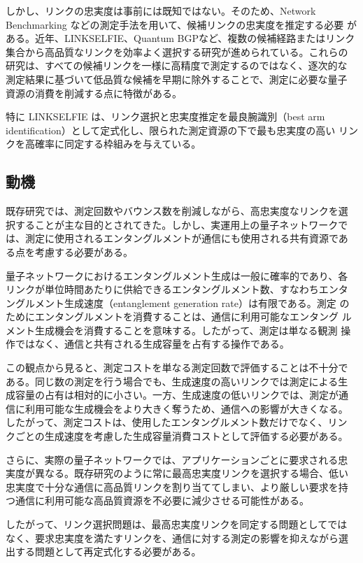 \documentclass[conference]{IEEEtran}
\begin{document}
しかし、リンクの忠実度は事前には既知ではない。そのため、Network
Benchmarking などの測定手法を用いて、候補リンクの忠実度を推定する必要
がある。近年、LINKSELFIE、Quantum BGPなど、複数の候補経路またはリンク
集合から高品質なリンクを効率よく選択する研究が進められている。これらの
研究は、すべての候補リンクを一様に高精度で測定するのではなく、逐次的な
測定結果に基づいて低品質な候補を早期に除外することで、測定に必要な量子
資源の消費を削減する点に特徴がある。

特に LINKSELFIE は、リンク選択と忠実度推定を最良腕識別（best arm
identification）として定式化し、限られた測定資源の下で最も忠実度の高い
リンクを高確率に同定する枠組みを与えている。

\subsection{動機}
\label{sec:orgf974fa5}

既存研究では、測定回数やバウンス数を削減しながら、高忠実度なリンクを選
択することが主な目的とされてきた。しかし、実運用上の量子ネットワークで
は、測定に使用されるエンタングルメントが通信にも使用される共有資源であ
る点を考慮する必要がある。

量子ネットワークにおけるエンタングルメント生成は一般に確率的であり、各
リンクが単位時間あたりに供給できるエンタングルメント数、すなわちエンタ
ングルメント生成速度（entanglement generation rate）は有限である。測定
のためにエンタングルメントを消費することは、通信に利用可能なエンタング
ルメント生成機会を消費することを意味する。したがって、測定は単なる観測
操作ではなく、通信と共有される生成容量を占有する操作である。

この観点から見ると、測定コストを単なる測定回数で評価することは不十分で
ある。同じ数の測定を行う場合でも、生成速度の高いリンクでは測定による生
成容量の占有は相対的に小さい。一方、生成速度の低いリンクでは、測定が通
信に利用可能な生成機会をより大きく奪うため、通信への影響が大きくなる。
したがって、測定コストは、使用したエンタングルメント数だけでなく、リン
クごとの生成速度を考慮した生成容量消費コストとして評価する必要がある。

さらに、実際の量子ネットワークでは、アプリケーションごとに要求される忠
実度が異なる。既存研究のように常に最高忠実度リンクを選択する場合、低い
忠実度で十分な通信に高品質リンクを割り当ててしまい、より厳しい要求を持
つ通信に利用可能な高品質資源を不必要に減少させる可能性がある。

したがって、リンク選択問題は、最高忠実度リンクを同定する問題としてでは
なく、要求忠実度を満たすリンクを、通信に対する測定の影響を抑えながら選
出する問題として再定式化する必要がある。
\end{document}
